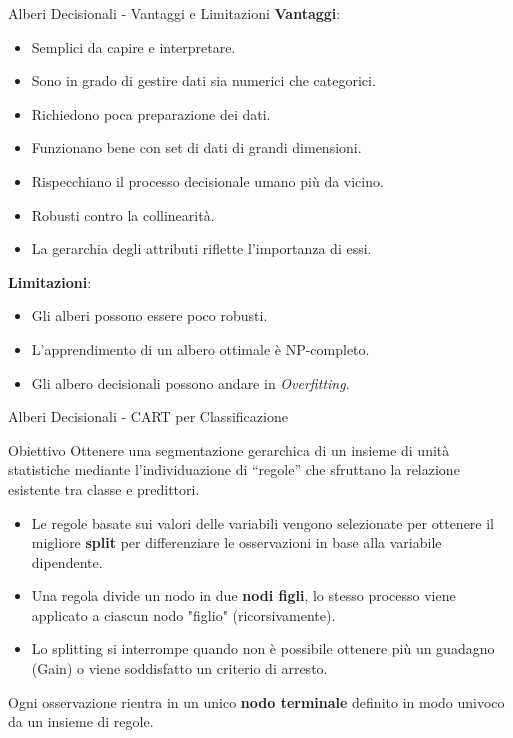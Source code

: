 \documentclass[9pt, xcolor=table]{beamer}
\begin{document}
	\begin{frame}{Alberi Decisionali - Vantaggi e Limitazioni}
		\textbf{Vantaggi}:
		\begin{itemize}
			\item Semplici da capire e interpretare.
			\item Sono in grado di gestire dati sia numerici che categorici.
			\item Richiedono poca preparazione dei dati.
			\item Funzionano bene con set di dati di grandi dimensioni.
			\item Rispecchiano il processo decisionale umano più da vicino.
			\item Robusti contro la collinearità.
			\item La gerarchia degli attributi riflette l'importanza di essi.
		\end{itemize}
	
		\vfill
		
		\textbf{Limitazioni}:
		\begin{itemize}
			\item Gli alberi possono essere poco robusti.
			\item L'apprendimento di un albero ottimale è NP-completo.
			\item Gli albero decisionali possono andare in \textit{Overfitting}.
		\end{itemize}
	\end{frame}

	\begin{frame}{Alberi Decisionali - CART per Classificazione}
		\begin{block}{Obiettivo}
			Ottenere una segmentazione gerarchica di un insieme di unità statistiche mediante l’individuazione di “regole” che sfruttano la relazione esistente tra classe e predittori.
		\end{block}
		
		\vfill
		
		\begin{itemize}
			\item Le regole basate sui valori delle variabili vengono selezionate per ottenere il migliore \textbf{split} per differenziare le osservazioni in base alla variabile dipendente.
			
			\item Una regola divide un nodo in due \textbf{nodi figli}, lo stesso processo viene applicato a ciascun nodo "figlio" (ricorsivamente).
			
			\item Lo splitting si interrompe quando non è possibile ottenere più un guadagno (Gain) o viene soddisfatto un criterio di arresto.
		\end{itemize}
	
		\vfill
	
		Ogni osservazione rientra in un unico \textbf{nodo terminale} definito in modo univoco da un insieme di regole.
	\end{frame}
\end{document}
